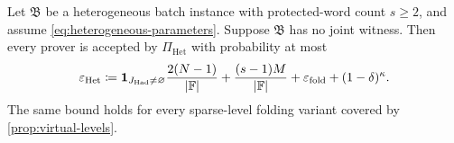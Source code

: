 \begin{theorem}
\label{thm:heterogeneous-soundness}
Let $\mathfrak B$ be a heterogeneous batch instance with protected-word count $s\ge2$, and assume \eqref{eq:heterogeneous-parameters}.  Suppose $\mathfrak B$ has no joint witness.  Then every prover is accepted by $\Pi_{\mathrm{Het}}$ with probability at most
\begin{equation}
  \varepsilon_{\mathrm{Het}}
  \coloneqq
  \mathbf 1_{J_{\mathrm{Had}}\ne\varnothing}
  \frac{2(N-1)}{|\mathbb{F}|}
  +\frac{(s-1)M}{|\mathbb{F}|}
  +\varepsilon_{\mathrm{fold}}
  +(1-\delta)^\kappa.
  \label{eq:heterogeneous-soundness}
\end{equation}
The same bound holds for every sparse-level folding variant covered by \cref{prop:virtual-levels}.
\end{theorem}

